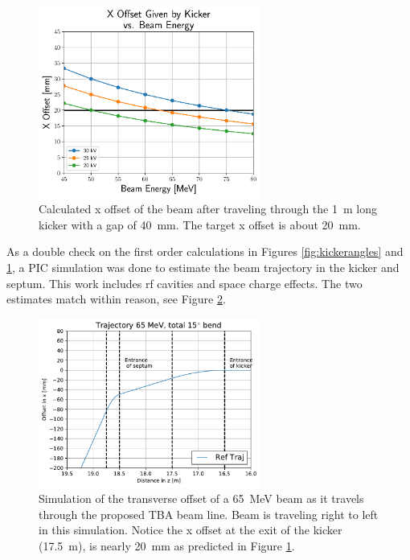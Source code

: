 \begin{figure}%
	\begin{center}
		\includegraphics[width=0.65\textwidth]{./images/XoffsetVsEnergy}
		\caption{Calculated x offset of the beam after traveling
		through the \SI{1}{m} long kicker with a gap of \SI{40}{mm}.
		The target x offset is about \SI{20}{mm}.}
		\label{fig:kickeroffset}
	\end{center}
\end{figure}
As a double check on the first order calculations in Figures \ref{fig:kickerangles} and \ref{fig:kickeroffset}, 
a PIC simulation was done to estimate the beam 
trajectory in the kicker and septum. 
This work includes rf cavities and space charge effects.
The two estimates match within reason, see Figure \ref{fig:beamtraj}. 
\begin{figure}
	\begin{center}
		\includegraphics[width=0.65\textwidth]{./images/tba_trajectory}
		\caption{Simulation of the transverse offset of a \SI{65}{MeV} beam as 
			it travels through the proposed TBA beam line. 
			Beam is traveling right to left in this simulation. 
			Notice the x offset at the exit of the kicker (\SI{17.5}{m}), 
			is nearly \SI{20}{mm} as predicted in Figure \ref{fig:kickeroffset}.}
		\label{fig:beamtraj}
	\end{center}
\end{figure}


